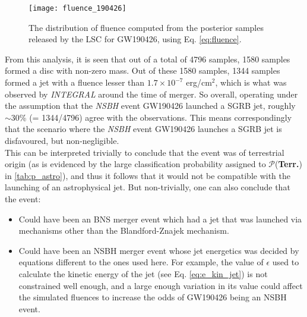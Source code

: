         \begin{figure}[ht]
            \centering
            \texttt{[image: fluence\_190426]}
            \caption[Fluence distribution for GW190426, from LSC Posteriors]
            {
                The distribution of fluence computed from the posterior samples released
                by the LSC for GW190426, using Eq. \ref{eq:fluence}.
            }
            \label{fig:fluence_190426}
        \end{figure}

        From this analysis, it is seen that out of a total of 4796 samples, 1580 samples
        formed a disc with non-zero mass. Out of these 1580 samples, 1344 samples formed
        a jet with a fluence lesser than $1.7 \times 10^{-7}$ erg/cm$^2$, which is what
        was observed by \textit{INTEGRAL} around the time of merger. So overall,
        operating under the assumption that the \emph{NSBH} event GW190426 launched a
        SGRB jet, roughly $\sim 30$\% (= 1344/4796) agree with the observations.  This
        means correspondingly that the scenario where the \emph{NSBH} event GW190426
        launches a SGRB jet is disfavoured, but non-negligible.\\
        This can be interpreted trivially to conclude that the event was of terrestrial
        origin (as is evidenced by the large classification probability assigned to
        $\mathcal{P}$(\textbf{Terr.}) in \ref{tab:p_astro}), and thus it follows that it
        would not be compatible with the launching of an astrophysical jet. But
        non-trivially, one can also conclude that the event:
        \begin{itemize}
            \item  Could have been an BNS merger event which had a jet that was launched
                via mechanisms other than the Blandford-Znajek mechanism.

            \item Could have been an NSBH merger event whose jet energetics was decided
                by equations different to the ones used here. For example, the value of
                $\epsilon$ used to calculate the kinetic energy of the jet (see Eq.
                \ref{eq:e_kin_jet}) is not constrained well enough, and a large enough
                variation in its value could affect the simulated fluences to increase
                the odds of GW190426 being an NSBH event.

        \end{itemize}

